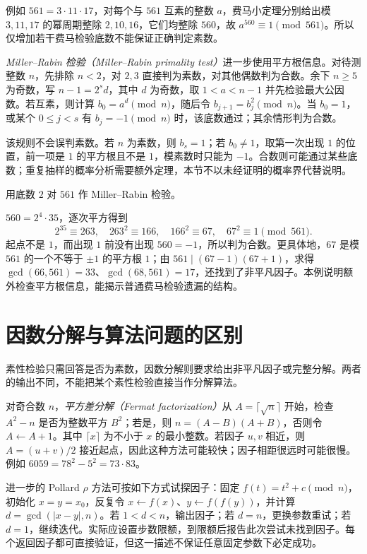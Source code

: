 例如 $561=3\cdot11\cdot17$，对每个与 $561$ 互素的整数 $a$，费马小定理分别给出模 $3,11,17$ 的幂周期整除 $2,10,16$，它们均整除 $560$，故 $a^{560}\equiv1\pmod{561}$。所以仅增加若干费马检验底数不能保证正确判定素数。

\emph{Miller--Rabin 检验（Miller--Rabin primality test）}进一步使用平方根信息。对待测整数 $n$，先排除 $n<2$，对 $2,3$ 直接判为素数，对其他偶数判为合数。余下 $n\ge5$ 为奇数，写 $n-1=2^sd$，其中 $d$ 为奇数，取 $1<a<n-1$ 并先检验最大公因数。若互素，则计算 $b_0=a^d\pmod n$，随后令 $b_{j+1}=b_j^2\pmod n$。当 $b_0=1$，或某个 $0\le j<s$ 有 $b_j=-1\pmod n$ 时，该底数通过；其余情形判为合数。

该规则不会误判素数。若 $n$ 为素数，则 $b_s=1$；若 $b_0\ne1$，取第一次出现 $1$ 的位置，前一项是 $1$ 的平方根且不是 $1$，模素数时只能为 $-1$。合数则可能通过某些底数；重复抽样的概率分析需要额外定理，本节不以未经证明的概率界代替说明。

\begin{example}[检验失败给出了怎样的证据]
用底数 $2$ 对 $561$ 作 Miller--Rabin 检验。
\end{example}
\begin{solve}
$560=2^4\cdot35$，逐次平方得到
\[
 2^{35}\equiv263,\quad263^2\equiv166,\quad
 166^2\equiv67,\quad67^2\equiv1\pmod{561}.
\]
起点不是 $1$，而出现 $1$ 前没有出现 $560=-1$，所以判为合数。更具体地，$67$ 是模 $561$ 的一个不等于 $\pm1$ 的平方根 $1$；由 $561\mid(67-1)(67+1)$，求得 $\gcd(66,561)=33$、$\gcd(68,561)=17$，还找到了非平凡因子。本例说明额外检查平方根信息，能揭示普通费马检验遗漏的结构。
\end{solve}

\section{因数分解与算法问题的区别}

素性检验只需回答是否为素数，因数分解则要求给出非平凡因子或完整分解。两者的输出不同，不能把某个素性检验直接当作分解算法。

对奇合数 $n$，\emph{平方差分解（Fermat factorization）}从 $A=\lceil\sqrt n\rceil$ 开始，检查 $A^2-n$ 是否为整数平方 $B^2$；若是，则 $n=(A-B)(A+B)$，否则令 $A\leftarrow A+1$。其中 $\lceil x\rceil$ 为不小于 $x$ 的最小整数。若因子 $u,v$ 相近，则 $A=(u+v)/2$ 接近起点，因此这种方法可能较快；因子相距很远时可能很慢。例如 $6059=78^2-5^2=73\cdot83$。

进一步的 Pollard $\rho$ 方法可按如下方式试探因子：固定 $f(t)=t^2+c\pmod n$，初始化 $x=y=x_0$，反复令 $x\leftarrow f(x)$、$y\leftarrow f(f(y))$，并计算 $d=\gcd(|x-y|,n)$。若 $1<d<n$，输出因子；若 $d=n$，更换参数重试；若 $d=1$，继续迭代。实际应设置步数限额，到限额后报告此次尝试未找到因子。每个返回因子都可直接验证，但这一描述不保证任意固定参数下必定成功。

